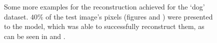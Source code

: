 \begin{figure}[ht]
\begin{center}
\end{center}
\caption{\small{
 Some more examples for the reconstruction achieved for the `dog' dataset. $40\%$ of the test image's pixels (figures  and ) were presented  to the model, which was able to successfully reconstruct them, as can be seen in  and .
}
}
\label{fig:supplDog}
\end{figure}
